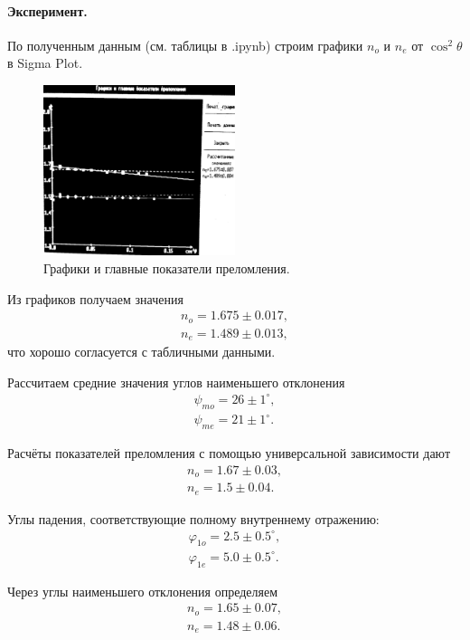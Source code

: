 \documentclass{../lab_class}
\begin{document}
\paragraph{Эксперимент.}

По полученным данным (см. таблицы в .ipynb) строим графики $n_o$ и $n_e$ от $\cos^2 \theta$ в Sigma Plot.

\begin{figure}[H]
	\centering
	\includegraphics[width = 0.5\textwidth]{screen.png}
	\caption{Графики и главные показатели преломления.}
\end{figure}

Из графиков получаем значения
\begin{gather*}
	n_o = 1.675 \pm 0.017, \\
	n_e = 1.489 \pm 0.013,
\end{gather*}
что хорошо согласуется с табличными данными. 

Рассчитаем средние значения углов наименьшего отклонения
\begin{gather*}
	\psi_{mo} = 26 \pm 1^{\circ}, \\
	\psi_{me} = 21 \pm 1^{\circ}.
\end{gather*}

Расчёты показателей преломления с помощью универсальной зависимости дают
\begin{gather*}
	n_o = 1.67 \pm 0.03, \\
	n_e = 1.5 \pm 0.04.
\end{gather*}

Углы падения, соответствующие полному внутреннему отражению:
\begin{gather*}
	\varphi_{1o} = 2.5 \pm {0.5}^{\circ}, \\
	\varphi_{1e} = 5.0 \pm {0.5}^{\circ}.
\end{gather*}

Через углы наименьшего отклонения определяем
\begin{gather*}
	n_o = 1.65 \pm 0.07, \\
	n_e = 1.48 \pm 0.06.
\end{gather*}
\end{document}
